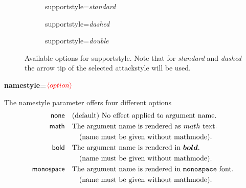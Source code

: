 \documentclass[headings=normal]{scrartcl}
\newcommand{\opt}[2][red]{\ensuremath{\textcolor{#1}{\langle #2\rangle}}}
\begin{document}
\begin{figure}[!h]
    \begin{subfigure}{0.32\textwidth}
        \centering
        \begin{af}[supportstyle=standard]
    
        \end{af}
        \caption{\textsf{supportstyle}=\textit{standard}}
        \label{fig:supportstyle_standard}
    \end{subfigure}
    \hfill
    \begin{subfigure}{0.3\textwidth}
        \centering
        \begin{af}[supportstyle=dashed]
    
        \end{af}
        \caption{\textsf{supportstyle}=\textit{dashed}}
        \label{fig:supportstyle_dashed}
    \end{subfigure}
    \hfill
    \begin{subfigure}{0.3\textwidth}
        \centering
        \begin{af}[supportstyle=double]
    
        \end{af}
        \caption{\textsf{supportstyle}=\textit{double}}
        \label{fig:supportstyle_double}
    \end{subfigure}
    \caption{Available options for \textsf{supportstyle}. Note that for \textit{standard} and \textit{dashed} the arrow tip of the selected \textsf{attackstyle} will be used.}
    \label{fig:supportstyle}
\end{figure}


{\bfseries\sffamily\noindent namestyle=\opt{option}}
    
    The \textsf{namestyle} parameter offers four different options
    \begin{align*}
        \mathsf{none} &\quad \text{(default) No effect applied to argument name.}\\
        \mathsf{math} &\quad \text{The argument name is rendered as $math$ text.}\\
        &\quad\quad \text{(name must be given without mathmode).}\\
        \mathsf{bold} &\quad \text{The argument name is rendered in $\boldsymbol{bold}$.}\\
        &\quad\quad \text{(name must be given without mathmode).}\\
        \mathsf{monospace} &\quad \text{The argument name is rendered in \texttt{monospace} font.}\\
        &\quad\quad \text{(name must be given without mathmode).}
    \end{align*}
\end{document}
